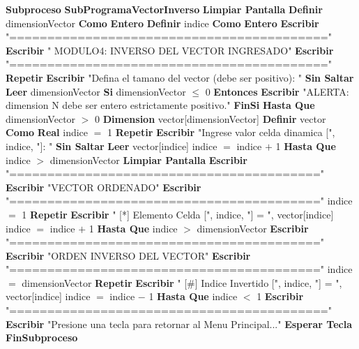 \documentclass[12pt,a4paper]{article}
\newcommand{\kw}[1]{\textcolor{pseKeyword}{\textbf{#1}}}
\newcommand{\txt}[1]{\textcolor{pseString}{"#1"}}
\newcommand{\num}[1]{\textcolor{pseNumber}{#1}}
\newcommand{\opAsig}{\textcolor{pseKeyword}{$=$}}
\newcommand{\opMas}{\textcolor{pseKeyword}{$+$}}
\newcommand{\opMenos}{\textcolor{pseKeyword}{$-$}}
\newcommand{\opMayor}{\textcolor{pseKeyword}{$>$}}
\newcommand{\opMenor}{\textcolor{pseKeyword}{$<$}}
\newcommand{\opMenorIgual}{\textcolor{pseKeyword}{$\leq$}}
\newcommand{\Asignacion}[2]{#1\; \opAsig\; #2}
\newcommand{\Escribir}[1]{\kw{Escribir} #1}
\newcommand{\EscribirSS}[1]{\kw{Escribir} #1 \kw{Sin Saltar}}
\newcommand{\Leer}[1]{\kw{Leer} #1}
\newcommand{\Definir}[2]{\kw{Definir} #1 \kw{Como} \kw{#2}}
\newcommand{\Si}[1]{\kw{Si} #1 \kw{Entonces}}
\newcommand{\FinSi}{\kw{FinSi}}
\newcommand{\Repetir}{\kw{Repetir}}
\newcommand{\HastaQue}[1]{\kw{Hasta Que} #1}
\newcommand{\Subproceso}[1]{\kw{Subproceso} \textbf{#1}}
\newcommand{\FinSubproceso}{\kw{FinSubproceso}}
\newcommand{\Dimension}[1]{\kw{Dimension} #1}
\newcommand{\I}{\hspace{1.5em}}
\newcommand{\II}{\hspace{3.0em}}
\newcommand{\III}{\hspace{4.5em}}
\begin{document}
\begin{algorithmic}[1]
	\State \Subproceso{SubProgramaVectorInverso}
	\State \I \kw{Limpiar Pantalla}
	\State \I \Definir{dimensionVector}{Entero}
	\State \I \Definir{indice}{Entero}
	\State
	\State \I \Escribir{\txt{==========================================}}
	\State \I \Escribir{\txt{ MODULO4: INVERSO DEL VECTOR INGRESADO}}
	\State \I \Escribir{\txt{==========================================}}
	\State
	\State \I \Repetir
	\State \II \EscribirSS{\txt{Defina el tamano del vector (debe ser positivo): }}
	\State \II \Leer{dimensionVector}
	\State \II \Si{dimensionVector \opMenorIgual{} \num{0}}
	\State \III \Escribir{\txt{ALERTA: dimension N debe ser entero estrictamente positivo.}}
	\State \II \FinSi
	\State \I \HastaQue{dimensionVector \opMayor{} \num{0}}
	\State
	\State \I \Dimension{vector[dimensionVector]}
	\State \I \Definir{vector}{Real}
	\State
	\State \I \Asignacion{indice}{\num{1}}
	\State \I \Repetir
	\State \II \EscribirSS{\txt{Ingrese valor celda dinamica [}, indice, \txt{]: }}
	\State \II \Leer{vector[indice]}
	\State \II \Asignacion{indice}{indice \opMas{} \num{1}}
	\State \I \HastaQue{indice \opMayor{} dimensionVector}
	\State
	\State \I \kw{Limpiar Pantalla}
	\State \I \Escribir{\txt{=========================================}}
	\State \I \Escribir{\txt{VECTOR ORDENADO}}
	\State \I \Escribir{\txt{=========================================}}
	\State \I \Asignacion{indice}{\num{1}}
	\State \I \Repetir
	\State \II \Escribir{\txt{  [*] Elemento Celda [}, indice, \txt{] = }, vector[indice]}
	\State \II \Asignacion{indice}{indice \opMas{} \num{1}}
	\State \I \HastaQue{indice \opMayor{} dimensionVector}
	\State
	\State \I \Escribir{\txt{=========================================}}
	\State \I \Escribir{\txt{ORDEN INVERSO DEL VECTOR}}
	\State \I \Escribir{\txt{=========================================}}
	\State \I \Asignacion{indice}{dimensionVector}
	\State \I \Repetir
	\State \II \Escribir{\txt{  [\#] Indice Invertido [}, indice, \txt{] = }, vector[indice]}
	\State \II \Asignacion{indice}{indice \opMenos{} \num{1}}
	\State \I \HastaQue{indice \opMenor{} \num{1}}
	\State \I \Escribir{\txt{==========================================}}
	\State \I \Escribir{\txt{Presione una tecla para retornar al Menu Principal...}}
	\State \I \kw{Esperar Tecla}
	\State \FinSubproceso
\end{algorithmic}




\end{document}
